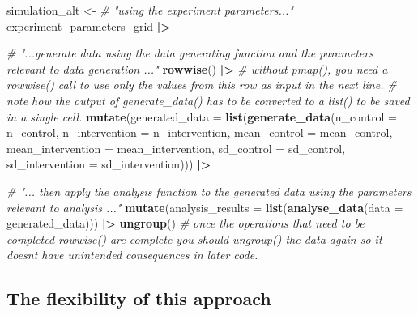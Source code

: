 \documentclass[
]{article}
\newenvironment{Shaded}{\begin{snugshade}}{\end{snugshade}}
\newcommand{\AttributeTok}[1]{\textcolor[rgb]{0.13,0.29,0.53}{#1}}
\newcommand{\CommentTok}[1]{\textcolor[rgb]{0.56,0.35,0.01}{\textit{#1}}}
\newcommand{\FunctionTok}[1]{\textcolor[rgb]{0.13,0.29,0.53}{\textbf{#1}}}
\newcommand{\NormalTok}[1]{#1}
\newcommand{\OtherTok}[1]{\textcolor[rgb]{0.56,0.35,0.01}{#1}}
\newcommand{\SpecialCharTok}[1]{\textcolor[rgb]{0.81,0.36,0.00}{\textbf{#1}}}
\begin{document}
\begin{Shaded}
\begin{Highlighting}[]
\NormalTok{simulation\_alt }\OtherTok{\textless{}{-}} 
  \CommentTok{\# "using the experiment parameters..."}
\NormalTok{  experiment\_parameters\_grid }\SpecialCharTok{|\textgreater{}}
  
  \CommentTok{\# "...generate data using the data generating function and the parameters relevant to data generation ..."}
  \FunctionTok{rowwise}\NormalTok{() }\SpecialCharTok{|\textgreater{}} \CommentTok{\# without pmap(), you need a rowwise() call to use only the values from this row as input in the next line.}
  \CommentTok{\# note how the output of generate\_data() has to be converted to a list() to be saved in a single cell.}
  \FunctionTok{mutate}\NormalTok{(}\AttributeTok{generated\_data =} \FunctionTok{list}\NormalTok{(}\FunctionTok{generate\_data}\NormalTok{(}\AttributeTok{n\_control =}\NormalTok{ n\_control, }
                                             \AttributeTok{n\_intervention =}\NormalTok{ n\_intervention,}
                                             \AttributeTok{mean\_control =}\NormalTok{ mean\_control,}
                                             \AttributeTok{mean\_intervention =}\NormalTok{ mean\_intervention,}
                                             \AttributeTok{sd\_control =}\NormalTok{ sd\_control,}
                                             \AttributeTok{sd\_intervention =}\NormalTok{ sd\_intervention))) }\SpecialCharTok{|\textgreater{}}
  
  \CommentTok{\# "... then apply the analysis function to the generated data using the parameters relevant to analysis ..."}
  \FunctionTok{mutate}\NormalTok{(}\AttributeTok{analysis\_results =} \FunctionTok{list}\NormalTok{(}\FunctionTok{analyse\_data}\NormalTok{(}\AttributeTok{data =}\NormalTok{ generated\_data))) }\SpecialCharTok{|\textgreater{}}
  \FunctionTok{ungroup}\NormalTok{() }\CommentTok{\# once the operations that need to be completed rowwise() are complete you should ungroup() the data again so it doesn\textquotesingle{}t have unintended consequences in later code.}
\end{Highlighting}
\end{Shaded}

\hypertarget{the-flexibility-of-this-approach}{%
\subsection{The flexibility of this
approach}\label{the-flexibility-of-this-approach}}
\end{document}
